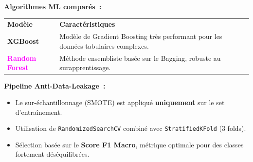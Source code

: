 \documentclass{article}
\newlength{\colW}  \setlength{\colW}{180mm}
\newcommand{\bodyfont}{\fontsize{15.3}{20.5}\selectfont}
\newcommand{\smallfont}{\fontsize{13.5}{18}\selectfont}
\newcommand{\metricfont}{\fontsize{34}{38}\selectfont\bfseries\ttfamily}
\newcommand{\labelfont}{\fontsize{13.5}{17}\selectfont\bfseries}
\newcommand{\citem}[1]{\item[\textcolor{CyanAccent}{\faAngleRight}] #1}
\begin{document}
\begin{minipage}[t]{\colW}
\vspace{5mm}

\begin{tcolorbox}[pc, title={\faCogs\; Mod\`eles \& Pipeline}]
\bodyfont\color{TextMain}

{\labelfont\color{CyanAccent}Algorithmes ML compar\'es~:}
\vspace{2mm}

{\smallfont
\renewcommand{\arraystretch}{1.5}
\begin{tabular}{@{}p{40mm}p{110mm}@{}}
\rowcolor{TableHead}
  \textcolor{TextMain}{\textbf{Mod\`ele}} &
  \textcolor{TextMain}{\textbf{Caract\'eristiques}} \\
\textbf{\textcolor{CyanAccent}{XGBoost}} & Mod\`ele de Gradient Boosting tr\`es performant pour les donn\'ees tabulaires complexes. \\
\rowcolor{RowAlt}
\textbf{\textcolor{Magenta}{Random Forest}} & M\'ethode ensembliste bas\'ee sur le Bagging, robuste au surapprentissage. \\
\end{tabular}
}

\vspace{6mm}
{\labelfont\color{CyanAccent}Pipeline Anti-Data-Leakage~:}
\begin{itemize}[leftmargin=6mm, itemsep=2.5mm, topsep=2mm]
  \citem{Le sur-\'echantillonnage (SMOTE) est appliqu\'e \textbf{uniquement} sur le set d'entra\^inement.}
  \citem{Utilisation de \texttt{\textcolor{TextMuted}{RandomizedSearchCV}} combin\'e avec \texttt{\textcolor{TextMuted}{StratifiedKFold}} (3 folds).}
  \citem{S\'election bas\'ee sur le \textbf{Score F1 Macro}, m\'etrique optimale pour des classes fortement d\'es\'equilibr\'ees.}
\end{itemize}
\end{tcolorbox}

\vspace{5mm}

\begin{tcolorbox}[pc, title={\faChartLine\; Indicateurs Cl\'es (KPIs)}]
\vspace{2mm}
\begin{center}
\end{center}
\vspace{2mm}
\end{tcolorbox}

\end{minipage}%
\end{document}
